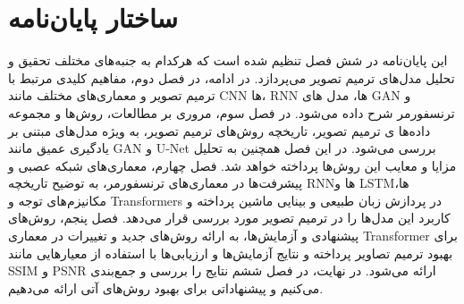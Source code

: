 \section{ساختار پایان‌نامه}

این پایان‌نامه در شش فصل تنظیم شده است که هرکدام به جنبه‌های مختلف تحقیق و تحلیل مدل‌های ترمیم تصویر می‌پردازد. در ادامه، در فصل دوم، مفاهیم کلیدی مرتبط با ترمیم تصویر و معماری‌های مختلف مانند CNN ها، RNN ها،‌ مدل های GAN و ترنسفورمر شرح داده می‌شود. در فصل سوم، مروری بر مطالعات، روش‌ها و مجموعه داده‌ها
ی ترمیم تصویر، تاریخچه روش‌های ترمیم تصویر، به ویژه مدل‌های مبتنی بر یادگیری عمیق مانند GAN و U-Net بررسی می‌شود. در این فصل همچنین به تحلیل مزایا و معایب این روش‌ها پرداخته خواهد شد. فصل چهارم، معماری‌های شبکه عصبی و پیشرفت‌ها در معماری‌های ترنسفورمر، به توضیح تاریخچه RNNها و LSTMها، مکانیزم‌های توجه و Transformers در پردازش زبان طبیعی و بینایی ماشین پرداخته و کاربرد این مدل‌ها را در ترمیم تصویر مورد بررسی قرار می‌دهد. فصل پنجم، روش‌های پیشنهادی و آزمایش‌ها، به ارائه روش‌های جدید و تغییرات در معماری Transformer برای بهبود ترمیم تصاویر پرداخته و نتایج آزمایش‌ها و ارزیابی‌ها با استفاده از معیارهایی مانند SSIM و PSNR ارائه می‌شود. در نهایت، در فصل ششم نتایج را بررسی و جمع‌بندی می‌کنیم و پیشنهاداتی برای بهبود روش‌های آتی ارائه می‌دهیم.